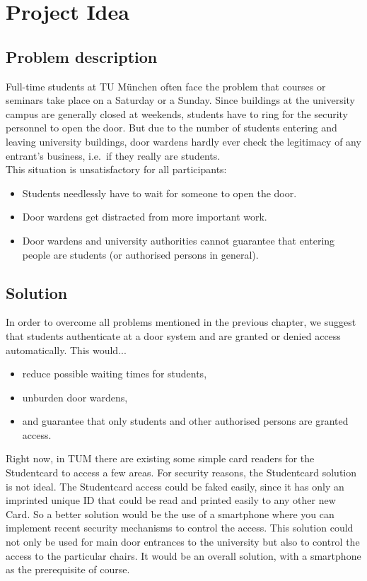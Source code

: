 \section{Project Idea}



\subsection{Problem description}

Full-time students at TU München often face the problem that courses or seminars take place on a Saturday or a Sunday.
Since buildings at the university campus are generally closed at weekends, students have to ring for the security personnel to open the door. But due to the number of students entering and leaving university buildings, door wardens hardly ever check the legitimacy of any entrant's business, i.e.~if they really are students.\\
This situation is unsatisfactory for all participants:

\begin{itemize}
\item Students needlessly have to wait for someone to open the door.
\item Door wardens get distracted from more important work.
\item Door wardens and university authorities cannot guarantee that entering people are students (or authorised persons in general).
\end{itemize}

\subsection{Solution}

In order to overcome all problems mentioned in the previous chapter, we suggest that students authenticate at a door system and are granted or denied access automatically. This would...

\begin{itemize}
\item reduce possible waiting times for students,
\item unburden door wardens,
\item and guarantee that only students and other authorised persons are granted access.
\end{itemize}

Right now, in TUM there are existing some simple card readers for the Studentcard to access a few areas. For security reasons, the Studentcard solution is not ideal. The Studentcard access could be faked easily, since it has only an imprinted unique ID that could be read and printed easily to any other new Card. So a better solution would be the use of a smartphone where you can implement recent security mechanisms to control the access. This solution could not only be used for main door entrances to the university but also to control the access to the particular chairs. It would be an overall solution, with a smartphone as the prerequisite of course.
